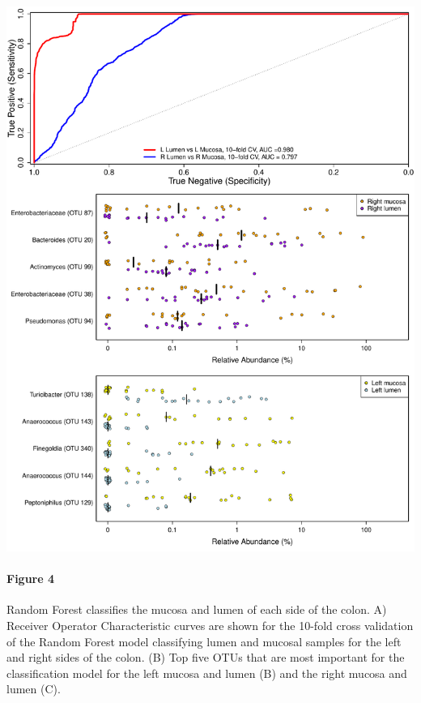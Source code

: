 \documentclass[11pt,]{article}
\let\oldparagraph\paragraph
\renewcommand{\paragraph}[1]{\oldparagraph{#1}\mbox{}}
\begin{document}
\includegraphics{submission/figure_4.pdf}

\paragraph{Figure 4}\label{figure-4}

Random Forest classifies the mucosa and lumen of each side of the colon.
A) Receiver Operator Characteristic curves are shown for the 10-fold
cross validation of the Random Forest model classifying lumen and
mucosal samples for the left and right sides of the colon. (B) Top five
OTUs that are most important for the classification model for the left
mucosa and lumen (B) and the right mucosa and lumen (C).

\newpage
\end{document}
